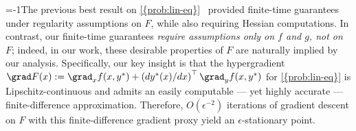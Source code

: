 \looseness=-1The previous best result on \cref{{prob:lin-eq}}~\cite{khanduri2023linearly} provided finite-time guarantees under regularity assumptions on $F$, while also requiring Hessian computations. In contrast, our finite-time guarantees \emph{require assumptions only on $f$ and $g$, not on $F$};
indeed, in our work, these desirable properties of $F$ are naturally implied by our analysis. 
Specifically, our key insight is that the hypergradient $\grad F(x):=\grad_{x}f(x,y^{*})+\left({d y^*(x)}/{dx}\right)^\top\grad_{y}f(x,y^{*})$ for  \cref{{prob:lin-eq}} is Lipschitz-continuous and  admits an easily computable --- yet highly accurate --- finite-difference approximation. Therefore, $O(\epsilon^{-2})$ iterations of gradient descent  on $F$ with this finite-difference gradient proxy  yield an $\epsilon$-stationary point. 


